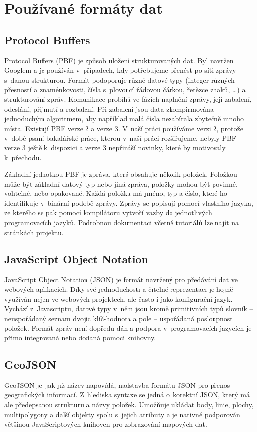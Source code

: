\section{Používané formáty dat}

\subsection{Protocol Buffers}
Protocol Buffers (PBF) \cite{PBF} je způsob uložení strukturovaných dat. Byl navržen
Googlem a je používán v~případech, kdy potřebujeme přenést po síti zprávy
s~danou strukturou. Formát podoporuje různé datové typy (integer různých přesností
a znaménkovosti, čísla s~plovoucí řádovou čárkou, řetězce znaků, \dots) a
strukturování zpráv. Komunikace probíhá ve fázích naplnění zprávy, její
zabalení, odeslání, přijmutí a rozbalení. Při zabalení jsou data zkompirmována
jednoduchým algoritmem, aby například malá čísla nezabírala zbytečně mnoho
místa. Existují PBF verze 2 a verze 3. V~naší práci používáme verzi 2, protože
v~době psaní bakalářské práce, kterou v~naší práci rozšiřujeme, nebyly PBF verze 3
ještě k~dispozici a verze 3 nepřináší novinky, které by motivovaly k~přechodu.

Základní jednotkou PBF je zpráva, která obsahuje několik položek. Položkou může
být základní datový typ nebo jiná zpráva, položky mohou být povinné, volitelné,
nebo opakované. Každá položka má jméno, typ a číslo, které ho identifikuje
v~binární podobě zprávy. Zprávy se popisují pomocí vlastního jazyka, ze kterého se
pak pomocí kompilátoru vytvoří vazby do jednotlivých programovacích jazyků. 
Podrobnou dokumentaci včetně tutoriálů lze najít na stránkách projektu. \cite{PBF}

\subsection{JavaScript Object Notation}
JavaScript Object Notation\cite{JSON} (JSON) je formát navržený pro předávání dat ve
webových aplikacích. Díky své jednoduchosti a čitelné reprezentaci je hojně
využíván nejen ve webových projektech, ale často i jako konfigurační jazyk.
Vychází z~Javascriptu, datové typy v~něm jsou kromě primitivních typů slovník --
neuspořádaný seznam dvojic klíč-hodnota a pole -- uspořádaná posloupnost
položek. Formát zpráv není dopředu dán a podpora v~programovacích jazycích je
přímo integrovaná nebo dodaná pomocí knihovny. 

\subsection{GeoJSON}
GeoJSON\cite{GeoJSON} je, jak již název napovídá, nadstavba formátu JSON pro přenos
geografických informací. Z~hlediska syntaxe se jedná o~korektní JSON, který má
ale předepsanou strukturu a názvy položek. Umožňuje ukládat body, linie, plochy,
multipolygony a další objekty spolu s~jejich atributy a je nativně podporován
většinou JavaScriptových knihoven pro zobrazování mapových dat.


